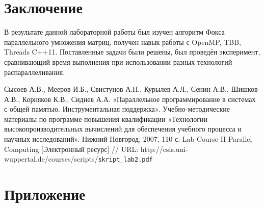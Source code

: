 \documentclass{report}
\begin{document}
\newpage

\section*{Заключение}
В результате данной лабораторной работы был изучен алгоритм Фокса параллельного умножения матриц, получен навык работы с OpenMP, TBB, Threads C++11. Поставленные задачи были решены, был проведён эксперимент, сравнивающий время выполнения при использовании разных технологий распараллеливания.\par

\newpage

\begin{thebibliography}{}
 Сысоев А.В., Мееров И.Б., Свистунов А.Н., Курылев А.Л., Сенин А.В., Шишков А.В., Корняков К.В., Сиднев А.А. «Параллельное программирование в системах с общей памятью. Инструментальная поддержка». Учебно-методические материалы по программе повышения квалификации «Технологии высокопроизводительных вычислений для обеспечения учебного процесса и научных исследований». Нижний Новгород, 2007, 110 с. 
 Lab Course II Parallel Computing [Электронный ресурс] // URL: http://csis.uni-wuppertal.de/courses/scripts/\verb|skript_lab2.pdf|

\end{thebibliography}

\newpage

\section*{Приложение}












\end{document}
